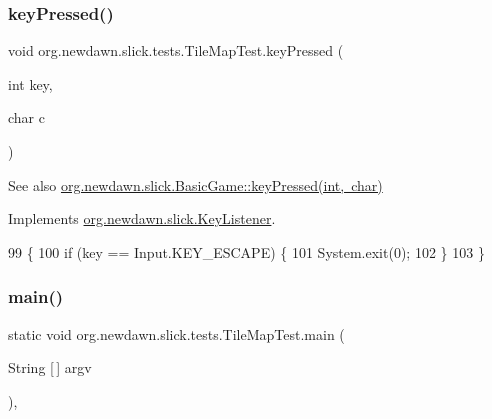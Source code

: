 \subsubsection{\texorpdfstring{key\+Pressed()}{keyPressed()}}
{\footnotesize\ttfamily void org.\+newdawn.\+slick.\+tests.\+Tile\+Map\+Test.\+key\+Pressed (\begin{DoxyParamCaption}\item[{int}]{key,  }\item[{char}]{c }\end{DoxyParamCaption})\hspace{0.3cm}{\ttfamily [inline]}}

\begin{DoxySeeAlso}{See also}
\mbox{\hyperlink{classorg_1_1newdawn_1_1slick_1_1_basic_game_a4fbb3345b5abf5ddd54a99466d07f02f}{org.\+newdawn.\+slick.\+Basic\+Game\+::key\+Pressed(int, char)}} 
\end{DoxySeeAlso}


Implements \mbox{\hyperlink{interfaceorg_1_1newdawn_1_1slick_1_1_key_listener_ac0b0568a21ef486c4f51382614c196ef}{org.\+newdawn.\+slick.\+Key\+Listener}}.


\begin{DoxyCode}
99                                             \{
100         \textcolor{keywordflow}{if} (key == Input.KEY\_ESCAPE) \{
101             System.exit(0);
102         \}
103     \}
\end{DoxyCode}
\mbox{\label{classorg_1_1newdawn_1_1slick_1_1tests_1_1_tile_map_test_a25f6f4309da85ca23aa292e757e586f9}} 
\subsubsection{\texorpdfstring{main()}{main()}}
{\footnotesize\ttfamily static void org.\+newdawn.\+slick.\+tests.\+Tile\+Map\+Test.\+main (\begin{DoxyParamCaption}\item[{String \mbox{[}$\,$\mbox{]}}]{argv }\end{DoxyParamCaption})\hspace{0.3cm}{\ttfamily [inline]}, {\ttfamily [static]}}

